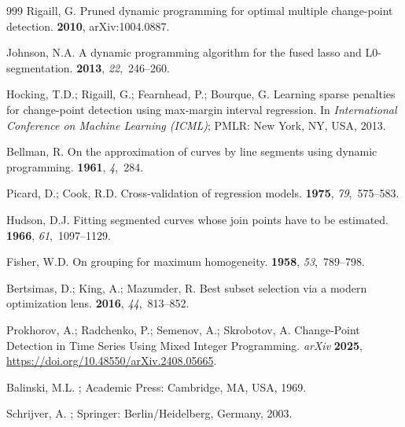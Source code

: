 \documentclass[mathematics,article,accept,pdftex,moreauthors]{Definitions/mdpi}
\begin{document}
\begin{thebibliography}{999}
Rigaill, G.
\newblock Pruned dynamic programming for optimal multiple change-point
  detection.
 {\bf 2010}, arXiv:1004.0887.

Johnson, N.A.
\newblock A dynamic programming algorithm for the fused lasso and
  L0-segmentation.
 {\bf 2013},
  {\em 22},~246--260.

Hocking, T.D.; Rigaill, G.; Fearnhead, P.; Bourque, G.
\newblock Learning sparse penalties for change-point detection using max-margin
  interval regression.  In \textit{International Conference on Machine Learning (ICML)}; PMLR: New York, NY, USA, 2013.

Bellman, R.
\newblock On the approximation of curves by line segments using dynamic
  programming.
 {\bf 1961}, {\em 4},~284.

Picard, D.; Cook, R.D.
\newblock Cross-validation of regression models.
 {\bf 1975},
  {\em 79},~575--583.

Hudson, D.J.
\newblock Fitting segmented curves whose join points have to be estimated.
 {\bf 1966},
  {\em 61},~1097--1129.

Fisher, W.D.
\newblock On grouping for maximum homogeneity.
 {\bf 1958},
  {\em 53},~789--798.

Bertsimas, D.; King, A.; Mazumder, R.
\newblock Best subset selection via a modern optimization lens.
 {\bf 2016}, {\em 44},~813--852.

Prokhorov, A.; Radchenko, P.; Semenov, A.; Skrobotov, A.
\newblock Change-Point Detection in Time Series Using Mixed Integer Programming. \textit{arXiv}
  {\bf 2025}, \url{https://doi.org/10.48550/arXiv.2408.05665}.


Balinski, M.L.
; Academic
  Press:  Cambridge, MA, USA,
  1969.

Schrijver, A.
; Springer: Berlin/Heidelberg, Germany,
2003.


\end{thebibliography}
\end{document}
